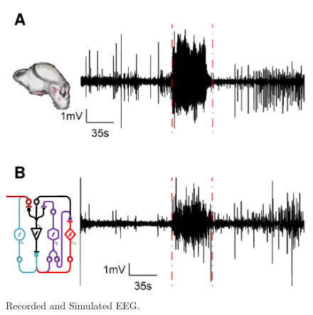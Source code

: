 \documentclass{article}%
\begin{document}
\begin{figure}
 	\centering
 		\includegraphics{fig/EEG.pdf}
 	\caption{Recorded and Simulated EEG.}
 	\label{fig: EEG}
 \end{figure}
\end{document}
